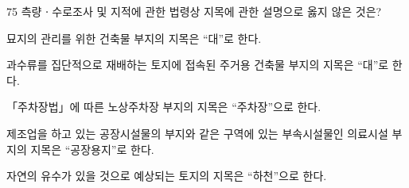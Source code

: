 \begin{question}{75}
측량ㆍ수로조사 및 지적에 관한 법령상 지목에 관한 설명으로 옳지 않은 것은?
\begin{choices}
  \item 묘지의 관리를 위한 건축물 부지의 지목은 “대”로 한다.
  \item 과수류를 집단적으로 재배하는 토지에 접속된 주거용 건축물 부지의 지목은 “대”로 한다.
  \item 「주차장법」에 따른 노상주차장 부지의 지목은 “주차장”으로 한다.
  \item 제조업을 하고 있는 공장시설물의 부지와 같은 구역에 있는 부속시설물인 의료시설 부지의 지목은 “공장용지”로 한다.
  \item 자연의 유수가 있을 것으로 예상되는 토지의 지목은 “하천”으로 한다.
\end{choices}
\end{question}
